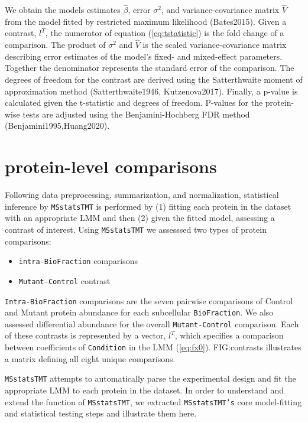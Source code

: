 \documentclass[11pt]{elife}\usepackage[]{graphicx}\usepackage[]{color}
\begin{document}
We obtain the models estimates $\hat{\beta}$, error $\sigma^2$, and
variance-covariance matrix $\hat{V}$ from the model fitted by restricted maximum
likelihood (Bates2015). Given a contrast, $l^T$, the numerator of equation
(\ref{eq:tstatistic}) is the fold change of a comparison.  The product of
$\sigma^2$ and $\hat{V}$ is the scaled variance-covariance matrix describing
error estimates of the model's fixed- and mixed-effect parameters.  Together the
denominator represents the standard error of the comparison. The degrees of
freedom for the contrast are derived using the Satterthwaite moment of
approximation method (Satterthwaite1946, Kutzenova2017).  Finally, a p-value is
calculated given the t-statistic and degrees of freedom.  P-values for the
protein-wise tests are adjusted using the Benjamini-Hochberg FDR method
(Benjamini1995,Huang2020).\\


\section{protein-level comparisons}

Following data preprocessing, summarization, and normalization, statistical
inference by \texttt{MSstatsTMT} is performed by (1) fitting each protein in the
dataset with an appropriate LMM and then (2) given the fitted model, assessing a
contrast of interest. Using \texttt{MSstatsTMT} we assesssed two types of
protein comparisons:
\begin{itemize}
	\item \texttt{intra-BioFraction} comparisons
	\item \texttt{Mutant-Control} contrast
\end{itemize}

\texttt{Intra-BioFraction} comparisons are the seven pairwise comparisons of 
Control and Mutant protein abundance for each subcellular
\texttt{BioFraction}. We also assessed differential abundance for the 
overall \texttt{Mutant-Control} comparison. Each of these contrasts is 
represented by a vector, $l^T$, which specifies a comparison between 
coefficients of \texttt{Condition} in the LMM (\ref{eq:fx0}).
FIG:contrasts illustrates a matrix defining all eight unique comparisons.

\texttt{MSstatsTMT} attempts to automatically parse the experimental design and
fit the appropriate LMM to each protein in the dataset. In order to understand 
and extend the function of \texttt{MSstatsTMT}, 
we extracted \texttt{MSstatsTMT's} core model-fitting and statistical 
testing steps and illustrate them here.
\end{document}

